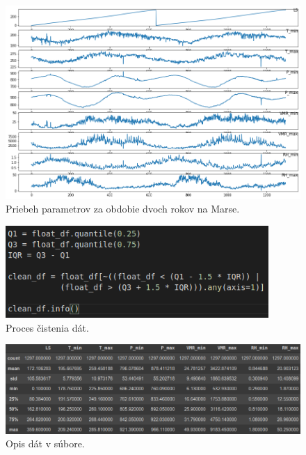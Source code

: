 \begin{figure}[!htbp]
  \centering
  \includegraphics[width=16cm]{img/full_df.png}
  \caption{Priebeh parametrov za obdobie dvoch rokov na Marse.}
  \label{fulldf}
\end{figure}

\begin{figure}[!htbp]
  \centering
  \includegraphics[width=10cm]{img/clean_data.png}
  \caption{Proces čistenia dát.}
  \label{cleandf}
\end{figure}

\begin{figure}[!htbp]
  \centering
  \includegraphics[width=16cm]{img/df_desc.png}
  \caption{Opis dát v súbore.}
  \label{dfdesc}
\end{figure}

